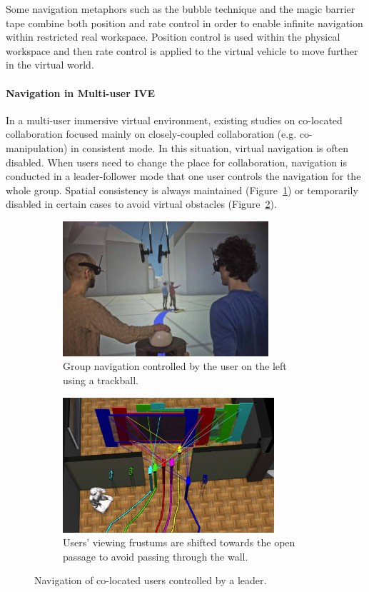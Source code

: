 Some navigation metaphors such as the bubble technique \citep{Dominjon2005Bubble} and the magic barrier tape \citep{Cirio2009MBT} combine both position and rate control in order to enable infinite navigation within restricted real workspace. Position control is used within the physical workspace and then rate control is applied to the virtual vehicle to move further in the virtual world.


\paragraph{Navigation in Multi-user IVE}
In a multi-user immersive virtual environment, existing studies on co-located collaboration focused mainly on closely-coupled collaboration (e.g. co-manipulation) in consistent mode. In this situation, virtual navigation is often disabled. When users need to change the place for collaboration, navigation is conducted in a leader-follower mode that one user controls the navigation for the whole group. Spatial consistency is always maintained \citep{Beck2013IGG} (Figure~\ref{fig:2_group_navig:group_navig_1}) or temporarily disabled \citep{Kulik2011CSS} in certain cases to avoid virtual obstacles (Figure~\ref{fig:2_group_navig:group_navig_2}).

\begin{figure}[htb]
  \begin{subfigure}{.5\textwidth}
    \centering
    \includegraphics[height=5cm]{figures/ch2/group_navig_1}
    \caption{Group navigation controlled by the user on the left using a trackball.}
    \label{fig:2_group_navig:group_navig_1}
  \end{subfigure}
  \begin{subfigure}{.5\textwidth}
    \centering
    \includegraphics[height=5cm]{figures/ch2/group_navig_2}
    \caption{Users' viewing frustums are shifted towards the open passage to avoid passing through the wall.}
    \label{fig:2_group_navig:group_navig_2}
  \end{subfigure}
  \caption{\label{fig:2_group_navig}Navigation of co-located users controlled by a leader.}
\end{figure}

